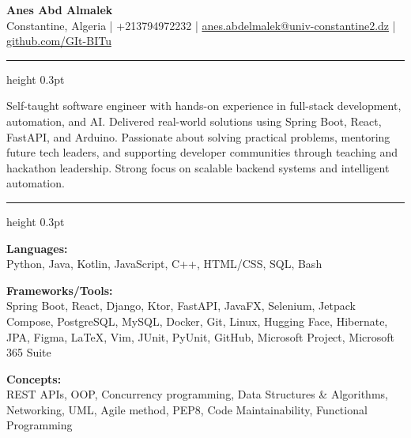 \documentclass{article}
\newcommand{\resumesection}[1]{
  \vspace{1.2ex}
  \noindent{\Large\textbf{\MakeUppercase{#1}}}
  \vspace{0.4ex}
  \hrule height 0.3pt
  \vspace{0.8ex}
}
\begin{document}
\begin{center}
    \vspace{-1em}
    {\Huge \textbf{Anes Abd Almalek}}\\
    \small Constantine, Algeria \quad | \quad +213794972232 \quad | \quad
    \href{mailto:anes.abdelmalek@univ-constantine2.dz}{anes.abdelmalek@univ-constantine2.dz} \quad | \quad
    \href{https://github.com/GIt-BITu}{github.com/GIt-BITu}
\end{center}

\resumesection{Summary}
\justifying
Self-taught software engineer with hands-on experience in full-stack development, automation, and AI.
Delivered real-world solutions using Spring Boot, React, FastAPI, and Arduino. Passionate about solving
practical problems, mentoring future tech leaders, and supporting developer communities through teaching 
and hackathon leadership. Strong focus on scalable backend systems and intelligent automation.

\resumesection{Technical Skills}

\raggedright
\textbf{Languages:}\\
Python, Java, Kotlin, JavaScript, C++, HTML/CSS, SQL, Bash

\textbf{Frameworks/Tools:}\\
Spring Boot, React, Django, Ktor, FastAPI, JavaFX, Selenium, Jetpack Compose, PostgreSQL, MySQL, Docker, Git,
Linux, Hugging Face, Hibernate, JPA, Figma, \LaTeX, Vim, JUnit, PyUnit, GitHub, Microsoft Project, 
Microsoft 365 Suite

\textbf{Concepts:}\\
REST APIs, OOP, Concurrency programming, Data Structures \& Algorithms, Networking, UML, Agile method, 
PEP8, Code Maintainability, Functional Programming
\end{document}
